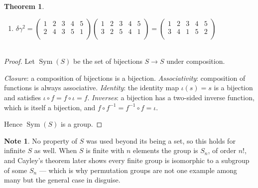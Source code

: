 \documentclass[11pt,a4paper]{article}
\theoremstyle{definition}
\newtheorem{thm}{Theorem}[subsection]
\newtheorem*{note}{Note}
\begin{document}
\begin{thm}
\begin{enumerate}
\item[(iii)] $\delta \gamma^2 = \begin{pmatrix}
1 & 2 & 3 & 4 & 5\\
2 & 4 & 3 & 5 & 1\\
\end{pmatrix}\begin{pmatrix}
1 & 2 & 3 & 4 & 5\\
3 & 2 & 5 & 4 & 1\\
\end{pmatrix} = \begin{pmatrix}
1 & 2 & 3 & 4 & 5\\
3 & 4 & 1 & 5 & 2\\
\end{pmatrix}$\\\\
\end{enumerate}
\end{thm}

\begin{proof}
Let $\operatorname{Sym}(S)$ be the set of bijections $S\rightarrow S$ under
composition.

\emph{Closure}: a composition of bijections is a bijection.
\emph{Associativity}: composition of functions is always associative.
\emph{Identity}: the identity map $\iota(s)=s$ is a bijection and satisfies
$\iota\circ f = f\circ\iota = f$.
\emph{Inverses}: a bijection has a two-sided inverse function, which is itself a
bijection, and $f\circ f^{-1} = f^{-1}\circ f = \iota$.

Hence $\operatorname{Sym}(S)$ is a group.
\end{proof}

\begin{note}
No property of $S$ was used beyond its being a set, so this holds for infinite
$S$ as well. When $S$ is finite with $n$ elements the group is $S_n$, of order
$n!$, and Cayley's theorem later shows every finite group is isomorphic to a
subgroup of some $S_n$ --- which is why permutation groups are not one example
among many but the general case in disguise.
\end{note}
\end{document}
